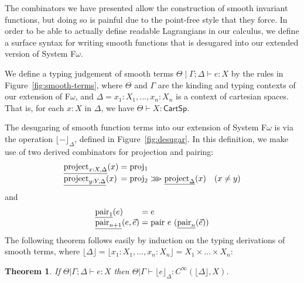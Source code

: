 \documentclass{sigplanconf}
\newcommand{\sepbar}{\mathrel|}
\newtheorem{theorem}{Theorem}
\newcommand{\comp}{\mathrel{>\kern-0.45em>\kern-0.45em>}}
\newcommand{\elab}[1]{\lfloor #1 \rfloor}
\theoremstyle{examplestyle}
\begin{document}
The combinators we have presented allow the construction of smooth
invariant functions, but doing so is painful due to the point-free
style that they force. In order to be able to actually define readable
Lagrangians in our calculus, we define a surface syntax for writing
smooth functions that is desugared into our extended version of System
F$\omega$.

We define a typing judgement of smooth terms $\Theta \sepbar \Gamma;
\Delta \vdash e : X$ by the rules in Figure~\ref{fig:smooth-terms},
where $\Theta$ and $\Gamma$ are the kinding and typing contexts of our
extension of F$\omega$, and $\Delta = x_1 : X_1, ..., x_n : X_n$ is a
context of cartesian spaces. That is, for each $x : X$ in $\Delta$, we
have $\Theta \vdash X : \mathsf{CartSp}$.

The desugaring of smooth function terms into our extension of System
F$\omega$ is via the operation $\elab{-}_\Delta$, defined in
Figure~\ref{fig:desugar}. In this definition, we make use of two
derived combinators for projection and pairing:
\begin{displaymath}
  \begin{array}{l@{\hspace{0.3em}}c@{\hspace{0.3em}}l}
    \underline{\mathrm{project}_{x : X, \Delta}}(x) & = & \mathrm{proj_1} \\
    \underline{\mathrm{project}_{y : Y, \Delta}}(x) & = & \mathrm{proj_2} \comp \underline{\mathrm{project}_\Delta}(x) \quad (x \not= y)
  \end{array}
\end{displaymath}
and
\begin{displaymath}
  \begin{array}{l@{\hspace{0.3em}}c@{\hspace{0.3em}}l}
    \underline{\mathrm{pair}_1}(e) & = & e \\
    \underline{\mathrm{pair}_{n+1}}(e, \vec{e}) & = & \mathrm{pair}~e~(\underline{\mathrm{pair}_n}(\vec{e}))
  \end{array}
\end{displaymath}
The following theorem follows easily by induction on the typing
derivations of smooth terms, where $\elab{\Delta} = \elab{x_1 : X_1,
  ..., x_n : X_n} = X_1 \times ... \times X_n$:
\begin{theorem}
  If $\Theta |\Gamma; \Delta \vdash e : X$ then $\Theta |
  \Gamma \vdash \elab{e}_\Delta : C^\infty(\elab{\Delta}, X)$.
\end{theorem}
\end{document}
